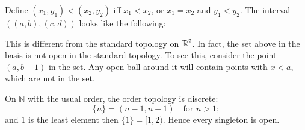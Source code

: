 \begin{example}
Define $(x_1,y_1)<(x_2,y_2)$ iff $x_1<x_2$, or $x_1=x_2$ and $y_1<y_2$. The interval $((a,b),(c,d))$ looks like the following:



This is different from the standard topology on $\mathbb{R}^2$. In fact, the set above in the basis is not open in the standard topology. To see this, consider the point $(a,b+1)$ in the set. Any open ball around it will contain points with $x<a$, which are not in the set.
\end{example}

\begin{example}
On $\mathbb{N}$ with the usual order, the order topology is discrete:
\[
\{n\}=(n-1,n+1)\quad\text{for }n>1;
\]
and $1$ is the least element then $\{1\}=[1,2)$. Hence every singleton is open.
\end{example}

